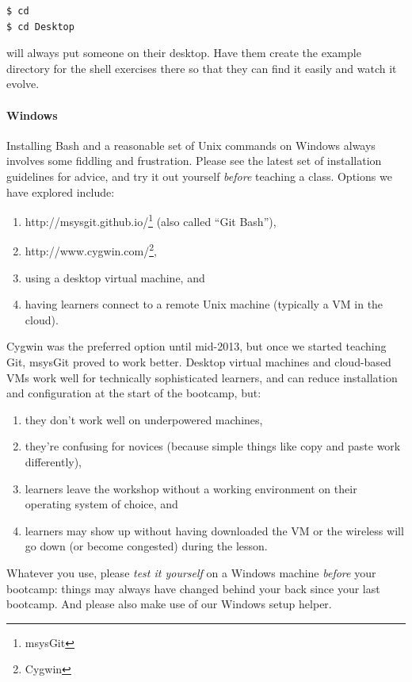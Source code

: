 \documentclass[]{book}
\newcommand{\urlfoot}[2]{{#1}\footnote{#2}}
\begin{document}
\begin{itemize}
\begin{verbatim}
$ cd
$ cd Desktop
\end{verbatim}

  will always put someone on their desktop. Have them create the example
  directory for the shell exercises there so that they can find it
  easily and watch it evolve.
\end{itemize}

\mbox{}\paragraph{Windows}

Installing Bash and a reasonable set of Unix commands on Windows always
involves some fiddling and frustration. Please see the latest set of
installation guidelines for advice, and try it out yourself
\emph{before} teaching a class. Options we have explored include:

\begin{enumerate}
\item
  \urlfoot{http://msysgit.github.io/}{msysGit} (also called ``Git Bash''),
\item
  \urlfoot{http://www.cygwin.com/}{Cygwin},
\item
  using a desktop virtual machine, and
\item
  having learners connect to a remote Unix machine (typically a VM in
  the cloud).
\end{enumerate}

Cygwin was the preferred option until mid-2013, but once we started
teaching Git, msysGit proved to work better. Desktop virtual machines
and cloud-based VMs work well for technically sophisticated learners,
and can reduce installation and configuration at the start of the
bootcamp, but:

\begin{enumerate}
\item
  they don't work well on underpowered machines,
\item
  they're confusing for novices (because simple things like copy and
  paste work differently),
\item
  learners leave the workshop without a working environment on their
  operating system of choice, and
\item
  learners may show up without having downloaded the VM or the wireless
  will go down (or become congested) during the lesson.
\end{enumerate}

Whatever you use, please \emph{test it yourself} on a Windows machine
\emph{before} your bootcamp: things may always have changed behind your
back since your last bootcamp. And please also make use of our Windows
setup helper.
\end{document}
